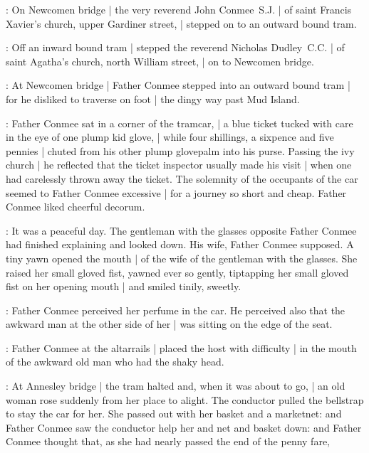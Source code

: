 :
On Newcomen bridge |
the very reverend John Conmee~S.J. |
of saint Francis Xavier's church, upper Gardiner street, |
stepped on to an outward bound tram.%

\begin{interject}
    :
    Off an inward bound tram |
    stepped the reverend Nicholas Dudley~C.C. |
    of saint Agatha's church, north William street, |
    on to Newcomen bridge.
\end{interject}%

:
At Newcomen bridge |
Father Conmee stepped into an outward bound tram |
for he disliked to traverse on foot |
the dingy way past Mud Island.

:
Father Conmee sat in a corner of the tramcar, |
a blue ticket tucked with care in the eye of one plump kid glove, |
while four shillings, a sixpence and five pennies |
chuted from his other plump glovepalm into his purse.
Passing the ivy church |
he reflected that the ticket inspector usually made his visit |
when one had carelessly thrown away the ticket.
The solemnity of the occupants of the car%
seemed to Father Conmee excessive |
for a journey so short and cheap.
Father Conmee liked cheerful decorum.

:
It was a peaceful day.
The gentleman with the glasses opposite Father Conmee
had finished explaining and looked down.
His wife, Father Conmee supposed.
A tiny yawn opened the mouth |
of the wife of the gentleman with the glasses.
She raised her small gloved fist,
yawned ever so gently,
tiptapping her small gloved fist on her opening mouth |
and smiled tinily, sweetly.

:
Father Conmee perceived her perfume in the car.
He perceived also that the awkward man at the other side of her |
was sitting on the edge of the seat.%

\begin{interject}
    :
    Father Conmee at the altarrails |
    placed the host with difficulty |
    in the mouth of the awkward old man who had the shaky head.
\end{interject}

:
At Annesley bridge |
the tram halted and, when it was about to go, |
an old woman rose suddenly from her place to alight.
The conductor pulled the bellstrap to stay the car for her.
She passed out with her basket and a marketnet:
and Father Conmee saw the conductor help her and net and basket down:
and Father Conmee thought
that, as she had nearly passed the end of the penny fare,


